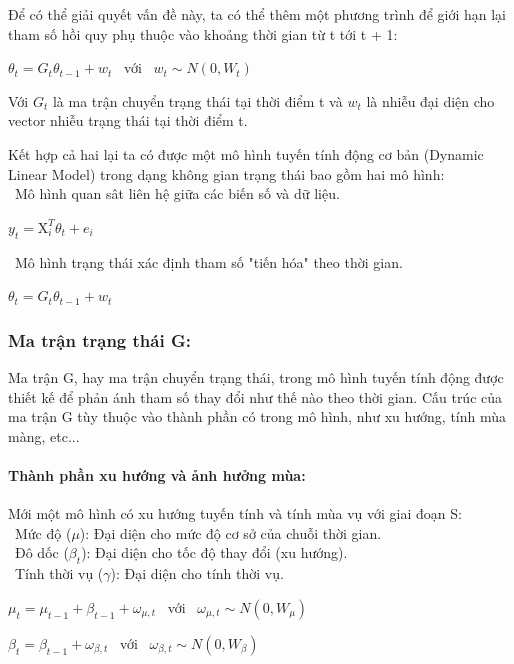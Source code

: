 \documentclass[conference]{IEEEtran}
\begin{document}
Để có thể giải quyết vấn đề này, ta có thể thêm một phương trình để giới hạn lại tham số hồi quy phụ thuộc vào khoảng thời gian từ t tới t + 1:
\begin{center}
    \(\theta_{t} = G_{t}\theta_{t-1} + w_{t}\) \ với \ \(w_{t}\sim N(0,W_{t})\)
\end{center}
Với \(G_{t}\) là ma trận chuyển trạng thái tại thời điểm t và \(w_{t}\) là nhiễu đại diện cho vector nhiễu trạng thái tại thời điểm t.

Kết hợp cả hai lại ta có được một mô hình tuyến tính động cơ bản (Dynamic Linear Model) trong dạng không gian trạng thái bao gồm hai mô hình:\\
\indent\textbullet\ Mô hình quan sât liên hệ giữa các biến số và dữ liệu.
\begin{center}
    \(y_{t} = \mathrm{X}_{i}^{T}\theta_{t} + e_{i}\)
\end{center}

\indent\textbullet\ Mô hình trạng thái xác định tham số "tiến hóa" theo thời gian.
\begin{center}
    \(\theta_{t} = G_{t}\theta_{t-1} + w_{t}\)
\end{center}
\subsubsection{Ma trận trạng thái G:}
Ma trận G, hay ma trận chuyển trạng thái, trong mô hình tuyến tính động được thiết kế để phản ánh tham số thay đổi như thế nào theo thời gian. Cấu trúc của ma trận G tùy thuộc vào thành phần có trong mô hình, như xu hướng, tính mùa màng, etc...
\paragraph{Thành phần xu hướng và ảnh hưởng mùa:}
Mới một mô hình có xu hướng tuyến tính và tính mùa vụ với giai đoạn S:\\
\indent\textbullet\ Mức độ (\(\mu\)): Đại diện cho mức độ cơ sở của chuỗi thời gian.\\
\indent\textbullet\ Đô dốc (\(\beta_{t}\)): Đại diện cho tốc độ thay đổi (xu hướng).\\
\indent\textbullet\ Tính thời vụ (\(\gamma\)): Đại diện cho tính thời vụ.
\begin{center}
    \(\mu_{t} = \mu_{t-1} + \beta_{t-1} + \omega_{\mu,t}\) \ với \ \(\omega_{\mu,t}\sim N(0,W_{\mu})\)
\end{center}

\begin{center}
    \(\beta_{t} = \beta_{t-1} + \omega_{\beta,t}\) \ với \ \(\omega_{\beta,t}\sim N(0,W_{\beta})\)
\end{center}
\end{document}
